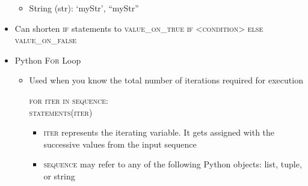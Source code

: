 \begin{itemize}
\begin{itemize}
      \item String (str): `myStr', ``myStr''

    \end{itemize}

  \item Can shorten \textsc{if} statements to \textsc{value\_on\_true if <condition> else value\_on\_false}

  \item Python \textsc{For} Loop

    \begin{itemize}

      \item Used when you know the total number of iterations required for execution

        \begin{center}
          \textsc{for iter in sequence:}\\
          \hspace{.5in}\textsc{statements(iter)}
        \end{center}

        \begin{itemize}

          \item \textsc{iter} represents the iterating variable. It gets assigned with the successive values from the input sequence

          \item \textsc{sequence} may refer to any of the following Python objects: list, tuple, or string

        \end{itemize}

    \end{itemize}

\end{itemize}



